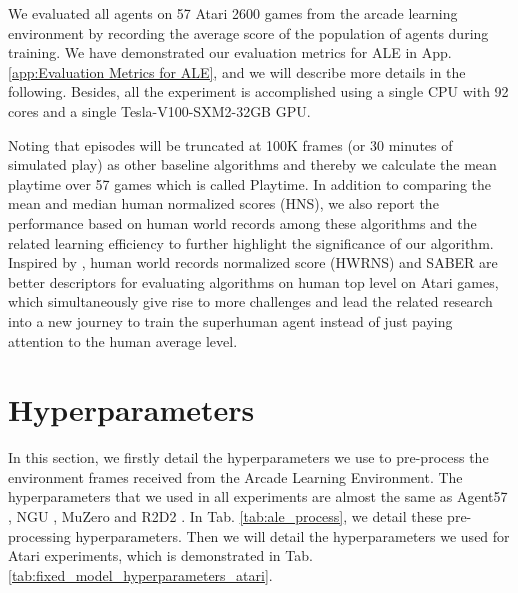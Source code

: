 We evaluated all agents on 57 Atari 2600 games from the arcade learning environment  \citep[ALE]{ale} by recording the average score of the population of agents during training. We have demonstrated our evaluation metrics for ALE in App. \ref{app:Evaluation Metrics for ALE}, and we will describe more details in the following. Besides, all the experiment is accomplished using a single CPU with 92 cores and a single Tesla-V100-SXM2-32GB GPU.

Noting that episodes will be truncated at 100K frames (or 30 minutes of simulated play) as other baseline algorithms \citep{rainbow,agent57,laser,ngu,r2d2} and thereby we calculate the mean playtime over 57 games which is called Playtime. In addition to comparing the mean and median human normalized scores (HNS), we also report the performance based on human world records among these algorithms and the related learning efficiency to further highlight the significance of our algorithm. Inspired by \citep{atarihuman}, human world records normalized score (HWRNS) and SABER are  better descriptors for evaluating algorithms on human top level on Atari games, which simultaneously give rise to more challenges and lead the related research into a new journey to train the superhuman agent instead of  just paying attention to  the human average level. 


\clearpage
\section{Hyperparameters}
\label{Sec: appendix hyperparameters}

In this section, we firstly detail the hyperparameters we use to pre-process the environment frames received from the Arcade Learning Environment. The hyperparameters that we used in all experiments are almost the same as Agent57  \citep{agent57}, NGU \citep{ngu}, MuZero \citep{muzero} and R2D2 \citep{r2d2}.
In Tab. \ref{tab:ale_process}, we detail these pre-processing hyperparameters. Then we will detail the hyperparameters we used for Atari experiments, which is demonstrated in Tab. \ref{tab:fixed_model_hyperparameters_atari}. 

